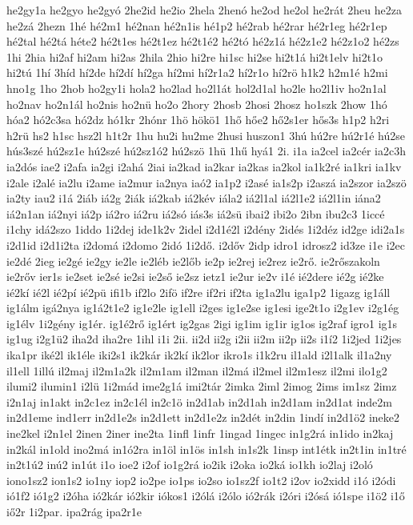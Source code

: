 {he2gy1a
he2gyo
he2gyó
2he2id
he2io
2hela
2henó
he2od
he2ol
he2rát
2heu
he2za
he2zá
2hezn
1hé
hé2m1
hé2nan
hé2n1is
hé1p2
hé2rab
hé2rar
hé2r1eg
hé2r1ep
hé2tal
hé2tá
héte2
hé2t1es
hé2t1ez
hé2t1é2
hé2tó
hé2z1á
hé2z1e2
hé2z1o2
hé2zs
1hi
2hia
hi2af
hi2am
hi2as
2hila
2hio
hi2re
hi1sc
hi2se
hi2t1á
hi2t1elv
hi2t1o
hi2tú
1hí
3híd
hí2de
hí2dí
hí2ga
hí2mi
hí2r1a2
hí2r1o
hí2rö
h1k2
h2m1é
h2mi
hno1g
1ho
2hob
ho2gy1i
hola2
ho2lad
ho2l1át
hol2d1al
ho2le
ho2l1iv
ho2n1al
ho2nav
ho2n1ál
ho2nis
ho2nü
ho2o
2hory
2hosb
2hosi
2hosz
ho1szk
2how
1hó
hóa2
hó2c3sa
hó2dz
hó1kr
2hónr
1hö
hökö1
1hő
hőe2
hő2s1er
hős3s
h1p2
h2ri
h2rü
hs2
h1sc
hsz2l
h1t2r
1hu
hu2i
hu2me
2husi
huszon1
3hú
hú2re
hú2r1é
hú2se
hús3szé
hú2sz1e
hú2szé
hú2sz1ó2
hú2szö
1hü
1hű
hyá1
2i.
i1a
ia2cel
ia2cér
ia2c3h
ia2dós
iae2
i2afa
ia2gi
i2ahá
2iai
ia2kad
ia2kar
ia2kas
ia2kol
ia1k2ré
ia1kri
ia1kv
i2ale
i2alé
ia2lu
i2ame
ia2mur
ia2nya
iaó2
ia1p2
i2asé
ia1s2p
i2aszá
ia2szor
ia2szö
ia2ty
iau2
i1á
2iáb
iá2g
2iák
iá2kab
iá2kév
iála2
iá2l1al
iá2l1e2
iá2l1in
iána2
iá2n1an
iá2nyi
iá2p
iá2ro
iá2ru
iá2só
iás3s
iá2sü
ibai2
ibi2o
2ibn
ibu2c3
1iccé
i1chy
idá2szo
1iddo
1i2dej
ide1k2v
2idel
i2d1é2l
i2dény
2idés
1i2déz
id2ge
idi2a1s
i2d1id
i2d1i2ta
i2domá
i2domo
2idó
1i2dő.
i2dőv
2idp
idro1
idrosz2
id3ze
i1e
i2ec
ie2dé
2ieg
ie2gé
ie2gy
ie2le
ie2léb
ie2lőb
ie2p
ie2rej
ie2rez
ie2rő.
ie2rőszakoln
ie2rőv
ier1s
ie2set
ie2sé
ie2si
ie2ső
ie2sz
ietz1
ie2ur
ie2v
i1é
ié2dere
ié2g
ié2ke
ié2kí
ié2l
ié2pí
ié2pü
ifi1b
if2lo
2ifö
if2re
if2ri
if2ta
ig1a2lu
iga1p2
1igazg
ig1áll
ig1álm
igá2nya
ig1á2t1e2
ig1e2le
ig1ell
i2ges
ig1e2se
ig1esi
ige2t1o
i2g1ev
i2g1ég
ig1élv
1i2gény
ig1ér.
ig1é2rő
ig1ért
ig2gas
2igi
ig1im
ig1ir
ig1os
ig2raf
igro1
ig1s
ig1ug
i2g1ü2
iha2d
iha2re
1ihl
i1i
2ii.
ii2d
ii2g
i2ii
ii2m
ii2p
ii2s
i1í2
1i2jed
1i2jes
ika1pr
iké2l
ik1éle
iki2s1
ik2kár
ik2kí
ik2lor
ikro1s
i1k2ru
il1ald
i2l1alk
il1a2ny
il1ell
1illú
il2maj
il2m1a2k
il2m1am
il2man
il2má
il2mel
il2m1esz
il2mi
ilo1g2
ilumi2
ilumin1
i2lü
1i2mád
ime2g1á
imi2tár
2imka
2iml
2imog
2ims
im1sz
2imz
i2n1aj
in1akt
in2c1ez
in2c1él
in2c1ö
in2d1ab
in2d1ah
in2d1am
in2d1at
inde2m
in2d1eme
ind1err
in2d1e2s
in2d1ett
in2d1e2z
in2dét
in2din
1indí
in2d1ö2
ineke2
ine2kel
i2n1el
2inen
2iner
ine2ta
1infl
1infr
1ingad
1ingec
in1g2rá
in1ido
in2kaj
in2kál
in1old
ino2má
in1ó2ra
in1öl
in1ös
in1sh
in1s2k
1insp
int1étk
in2t1in
in1tré
in2t1ú2
inú2
in1út
i1o
ioe2
i2of
io1g2rá
io2ik
i2oka
io2ká
io1kh
io2laj
i2oló
iono1sz2
ion1s2
io1ny
iop2
io2pe
io1ps
io2so
io1sz2f
io1t2
i2ov
io2xidd
i1ó
i2ódi
ió1f2
ió1g2
i2óha
ió2kár
ió2kir
iókos1
i2ólá
i2ólo
ió2rák
i2óri
i2ósá
ió1spe
i1ö2
i1ő
iő2r
1i2par.
ipa2rág
ipa2r1e
}
